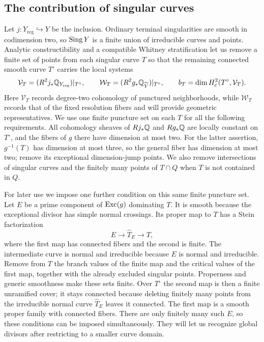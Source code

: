 \subsection{The contribution of singular curves}

Let $j\colon Y_{\mathrm{reg}}\hookrightarrow Y$ be the inclusion.
Ordinary terminal singularities are smooth in codimension two, so
$\operatorname{Sing} Y$ is a finite union of irreducible curves and points.  Analytic
constructibility and a compatible Whitney stratification let us
remove a finite set of points from each singular curve $T$ so that
the remaining connected smooth curve $T^\circ$ carries the local
systems
\begin{equation}\label{eq:branch-local-systems}
 \mathcal V_T=(R^2j_*\mathbb{Q}_{Y_{\mathrm{reg}}})|_{T^\circ},\qquad
 \mathcal W_T=(R^2g_*\mathbb{Q}_{\widetilde Y})|_{T^\circ},\qquad
 b_T=\dim H_c^2(T^\circ,\mathcal V_T).
\end{equation}
Here $\mathcal V_T$ records degree-two cohomology of punctured
neighborhoods, while $\mathcal W_T$ records that of the fixed
resolution fibers and will provide geometric representatives.
We use one finite puncture set on each $T$ for all the following
requirements.  All cohomology sheaves of $Rj_*\mathbb{Q}$ and $Rg_*\mathbb{Q}$ are
locally constant on $T^\circ$, and the fibers of $g$ there have
dimension at most two.  For the latter assertion,
$g^{-1}(T)$ has dimension at most three, so the general fiber has
dimension at most two; remove its exceptional dimension-jump points.
We also remove intersections of singular curves and the finitely
many points of $T\cap Q$ when $T$ is not contained in $Q$.

For later use we impose one further condition on this same finite
puncture set.  Let $E$ be a prime component of $\operatorname{Exc}(g)$ dominating
$T$.  It is smooth because the exceptional divisor has simple normal
crossings.  Its proper map to $T$ has a Stein factorization
\[
 E\longrightarrow\widehat T_E\longrightarrow T,
\]
where the first map has connected fibers and the second is finite.
The intermediate curve is normal and irreducible because $E$ is
normal and irreducible.  Remove from $T$ the branch values of the
finite map and the critical values of the first map, together with
the already excluded singular points.  Properness and generic
smoothness make these sets finite.  Over $T^\circ$ the second map
is then a finite unramified cover; it stays connected because deleting
finitely many points from the irreducible normal curve
$\widehat T_E$ leaves it connected.  The first map is a smooth proper
family with connected fibers.  There are only finitely many
such $E$, so these conditions can be imposed simultaneously.  They
will let us recognize global divisors after restricting to a smaller
curve domain.

